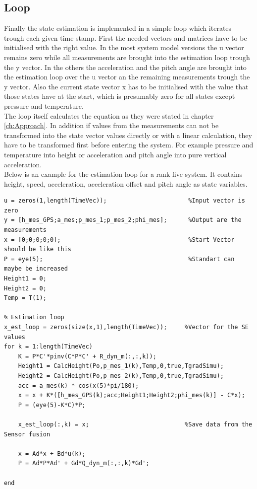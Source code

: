 \subsection{Loop}
Finally the state estimation is implemented in a simple loop which iterates trough each given time stamp.
First the needed vectors and matrices have to be initialised with the right value.
In the most system model versions the u vector remains zero while all measurements are brought into the estimation loop trough the y vector.
In the others the acceleration and the pitch angle are brought into the estimation loop over the u vector an the remaining measurements trough the y vector.
Also the current state vector x has to be initialised with the value that those states have at the start, 
which is presumably zero for all states except pressure and temperature.\\
The loop itself calculates the equation as they were stated in chapter \ref{ch:Approach}.
In addition if values from the measurements can not be transformed into the state vector values directly or with a linear calculation,
they have to be transformed first before entering the system.
For example pressure and temperature into height or acceleration and pitch angle into pure vertical acceleration.\\
Below is an example for the estimation loop for a rank five system.
It contains height, speed, acceleration, acceleration offset and pitch angle as state variables.
\begin{lstlisting}[caption={State Estimation Loop}]
% Initalzation
u = zeros(1,length(TimeVec));                       %Input vector is zero
y = [h_mes_GPS;a_mes;p_mes_1;p_mes_2;phi_mes];      %Output are the measurements
x = [0;0;0;0;0];                                    %Start Vector should be like this
P = eye(5);                                         %Standart can maybe be increased
Height1 = 0;
Height2 = 0;
Temp = T(1);

% Estimation loop
x_est_loop = zeros(size(x,1),length(TimeVec));     %Vector for the SE values
for k = 1:length(TimeVec)
    K = P*C'*pinv(C*P*C' + R_dyn_m(:,:,k));
    Height1 = CalcHeight(Po,p_mes_1(k),Temp,0,true,TgradSimu);
    Height2 = CalcHeight(Po,p_mes_2(k),Temp,0,true,TgradSimu);
    acc = a_mes(k) * cos(x(5)*pi/180);
    x = x + K*([h_mes_GPS(k);acc;Height1;Height2;phi_mes(k)] - C*x);
    P = (eye(5)-K*C)*P;
    
    x_est_loop(:,k) = x;                           %Save data from the Sensor fusion
    
    x = Ad*x + Bd*u(k);
    P = Ad*P*Ad' + Gd*Q_dyn_m(:,:,k)*Gd';

end
\end{lstlisting}

